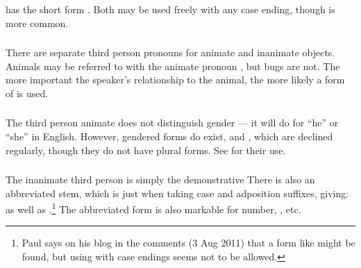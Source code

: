 \subsubsection{}  has the short form .
Both may be used freely with any case ending, though  is more
common.

\subsubsection{} There are separate third person pronouns for animate and
inanimate objects. Animals may be referred to with the animate
pronoun , but bugs are not. The more important the
speaker's relationship to the animal, the more likely a form of 
is used.

\subsubsection{} The third person animate  does not distinguish
gender --- it will do for ``he'' or ``she'' in English.  However,
gendered forms do exist,   and 
, which are declined regularly, though they do not have plural
forms.  See  for their use.
\label{morph:pron:gender}

\subsubsection{} The inanimate third person is simply the
demonstrative    There is also an abbreviated
stem,  which is just  when taking case and adposition
suffixes, giving:  as
well as .\footnote{Paul says on his blog in the comments
(3 Aug 2011) that a form like  might be found, but
using  with case endings seems not to be allowed.}  The
abbreviated form is also markable for number, , etc.
\label{morph:pron:tsa}

